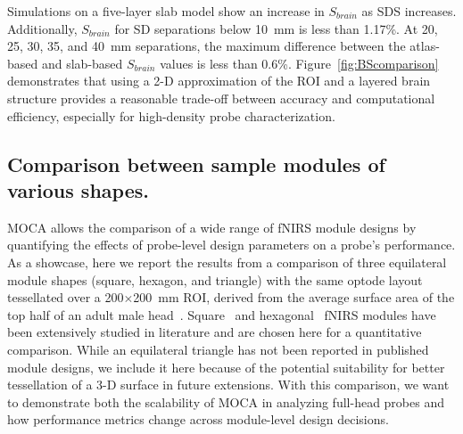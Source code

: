 Simulations on a five-layer slab model show an increase in $S_{brain}$ as \ac{SDS} increases. Additionally, $S_{brain}$ for \ac{SD} separations below 10~mm is less than 1.17\%. At 20, 25, 30, 35, and 40~mm separations, the maximum difference between the atlas-based and slab-based $S_{brain}$ values is less than 0.6\%. Figure~\ref{fig:BScomparison} demonstrates that using a 2-D approximation of the \ac{ROI} and a layered brain structure provides a reasonable trade-off between accuracy and computational efficiency, especially for high-density probe characterization.

\subsection{Comparison between sample modules of various shapes.}
\label{subsec:comparison}
\ac{MOCA} allows the comparison of a wide range of \ac{fNIRS} module designs by quantifying the effects of probe-level design parameters on a probe's performance. As a showcase, here we report the results from a comparison of three equilateral module shapes (square, hexagon, and triangle) with the same optode layout tessellated over a 200$\times$200~mm \ac{ROI}, derived from the average surface area of the top half of an adult male head~\cite{McConville1980}. Square~\cite{Chitnis2016, Bci2017, Zimmermann2013} and hexagonal~\cite{Funane2017, Wyser2017, Zhao2019} \ac{fNIRS} modules have been extensively studied in literature and are chosen here for a quantitative comparison. While an equilateral triangle has not been reported in published module designs, we include it here because of the potential suitability for better tessellation of a 3-D surface in future extensions. With this comparison, we want to demonstrate both the scalability of \ac{MOCA} in analyzing full-head probes and how performance metrics change across module-level design decisions.

